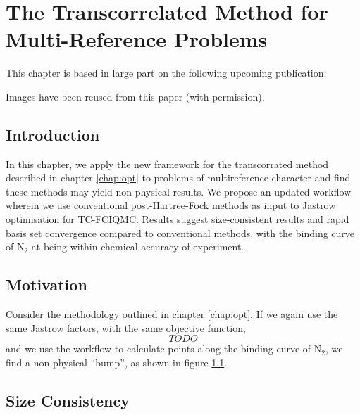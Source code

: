 \chapter{The Transcorrelated Method for Multi-Reference Problems}
\label{chap:binding}

This chapter is based in large part on the following upcoming publication:\\

Images have been reused from this paper (with permission).

\section{Introduction}

In this chapter, we apply the new framework for the transcorrated method described in chapter \ref{chap:opt} to problems of multireference character and find these methods may yield non-physical results. We propose an updated workflow wherein we use conventional post-Hartree-Fock methods as input to Jastrow optimisation for TC-FCIQMC. Results suggest size-consistent results and rapid basis set convergence compared to conventional methods, with the binding curve of N$_2$ at \avtz being within chemical accuracy of experiment.

\section{Motivation}

Consider the methodology outlined in chapter \ref{chap:opt}. If we again use the same Jastrow factors,
with the same objective function,
\begin{equation}
\label{eq:varref_hf}
TODO
\end{equation}
and we use the workflow to calculate points along the binding curve of N$_2$, we find a non-physical ``bump'', as shown in figure \ref{fig:binding-dip}.

\begin{figure}[htbp]
    \centering

    \caption{}
    \label{fig:binding-dip}
\end{figure}


\section{Size Consistency}

